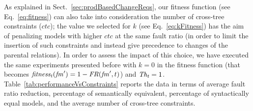 \begin{tikzborder}{\cite{Gargantini16:validation}}
\begin{tikzborder}{\cite{gargantini_combinatorial_2017}}
\begin{tikzborder}{\cite{garn2019}}
\begin{tikzborder}{\cite{arcaini2019achieving}}
	
	
	As explained in Sect.~\ref{sec:prodBasedChangeReqs}, our fitness function (see Eq.~\ref{eq:fitness}) can also take into consideration the number of cross-tree constraints ($\mathit{ctc}$); the value we selected for $k$ (see Eq.~\ref{eq:kFitness}) has the aim of penalizing models with higher $\mathit{ctc}$ at the same fault ratio (in order to limit the insertion of such constraints and instead give precedence to changes of the parental relations). In order to assess the impact of this choice, we have executed the same experiments presented before with $k=0$ in the fitness function (that becomes $\mathit{fitness_t}(\mathit{fm}^\prime) = 1 - \mathit{FR}(\mathit{fm}^\prime, t)$) and $\mathit{Th_t}=1$. Table~\ref{tab:performanceVsConstraints} reports the data in terms of average fault ratio reduction, percentage of semantically equivalent, percentage of syntactically equal models, and the average number of cross-tree constraints.
	\be
	

\end{tikzborder}
\end{tikzborder}
\end{tikzborder}
\end{tikzborder}
